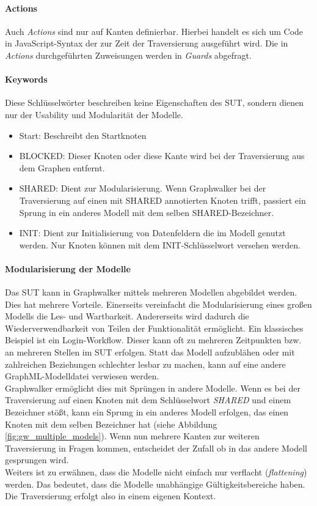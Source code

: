 \paragraph{Actions} Auch \textit{Actions} sind nur auf Kanten definierbar. Hierbei handelt es sich um Code in JavaScript-Syntax der zur Zeit der Traversierung ausgeführt wird. Die in \textit{Actions} durchgeführten Zuweisungen werden in \textit{Guards} abgefragt.

\paragraph{Keywords} Diese Schlüsselwörter beschreiben keine Eigenschaften des SUT, sondern dienen nur der Usability und Modularität der Modelle.


\begin{itemize}
\item Start: Beschreibt den Startknoten
\item BLOCKED: Dieser Knoten oder diese Kante wird bei der Traversierung aus dem Graphen entfernt.
\item SHARED: Dient zur Modularisierung. Wenn Graphwalker bei der Traversierung auf einen mit SHARED annotierten Knoten trifft, passiert ein Sprung in ein anderes Modell mit dem selben SHARED-Bezeichner.
\item INIT: Dient zur Initialisierung von Datenfeldern die im Modell genutzt werden. Nur Knoten können mit dem INIT-Schlüsselwort versehen werden.
\end{itemize} 

\paragraph{Modularisierung der Modelle}
Das SUT kann in Graphwalker mittels mehreren Modellen abgebildet werden. Dies hat mehrere Vorteile. Einerseits vereinfacht die Modularisierung eines großen Modells die Les- und Wartbarkeit. Andererseits wird dadurch die Wiederverwendbarkeit von Teilen der Funktionalität ermöglicht. Ein klassisches Beispiel ist ein Login-Workflow. Dieser kann oft zu mehreren Zeitpunkten bzw. an mehreren Stellen im SUT erfolgen. Statt das Modell aufzublähen oder mit zahlreichen Beziehungen schlechter lesbar zu machen, kann auf eine andere GraphML-Modelldatei verwiesen werden.\\
Graphwalker ermöglicht dies mit Sprüngen in andere Modelle. Wenn es bei der Traversierung auf einen Knoten mit dem Schlüsselwort \textit{SHARED} und einem Bezeichner stößt, kann ein Sprung in ein anderes Modell erfolgen, das einen Knoten mit dem selben Bezeichner hat (siehe Abbildung \ref{fig:gw_multiple_models}). Wenn nun mehrere Kanten zur weiteren Traversierung in Fragen kommen, entscheidet der Zufall ob in das andere Modell gesprungen wird.\\
Weiters ist zu erwähnen, dass die Modelle nicht einfach nur verflacht (\textit{flattening}) werden. Das bedeutet, dass die Modelle unabhängige Gültigkeitsbereiche haben. Die Traversierung erfolgt also in einem eigenen Kontext.

